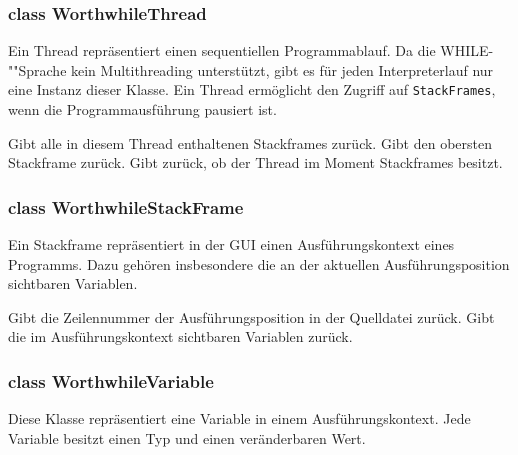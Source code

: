 \subsubsection{class WorthwhileThread}

Ein Thread repräsentiert einen sequentiellen Programmablauf. Da die WHILE-""Sprache kein Multithreading unterstützt, gibt es für jeden Interpreterlauf nur eine Instanz dieser Klasse. Ein Thread ermöglicht den Zugriff auf \texttt{StackFrames}, wenn die Programmausführung pausiert ist.

\begin{description}
	 Gibt alle in diesem Thread enthaltenen Stackframes zurück.
	 Gibt den obersten Stackframe zurück.
	 Gibt zurück, ob der Thread im Moment Stackframes besitzt.
\end{description}

\subsubsection{class WorthwhileStackFrame}

Ein Stackframe repräsentiert in der GUI einen Ausführungskontext eines Programms. Dazu gehören insbesondere die an der aktuellen Ausführungsposition sichtbaren Variablen.

\begin{description}
	 Gibt die Zeilennummer der Ausführungsposition in der Quelldatei zurück.
	 Gibt die im Ausführungskontext sichtbaren Variablen zurück.
\end{description}

\subsubsection{class WorthwhileVariable}

Diese Klasse repräsentiert eine Variable in einem Ausführungskontext. Jede Variable besitzt einen Typ und einen veränderbaren Wert.

